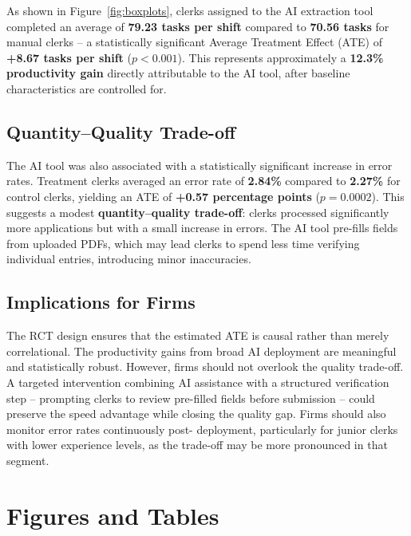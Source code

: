 \documentclass[12pt]{article}
\begin{document}
As shown in Figure~\ref{fig:boxplots}, clerks assigned to the AI
extraction tool completed an average of \textbf{79.23 tasks per
shift} compared to \textbf{70.56 tasks} for manual clerks -- a
statistically significant Average Treatment Effect (ATE) of
\textbf{+8.67 tasks per shift} ($p < 0.001$). This represents
approximately a \textbf{12.3\% productivity gain} directly
attributable to the AI tool, after baseline characteristics
are controlled for.

\subsection*{Quantity--Quality Trade-off}

The AI tool was also associated with a statistically significant
increase in error rates. Treatment clerks averaged an error rate
of \textbf{2.84\%} compared to \textbf{2.27\%} for control clerks,
yielding an ATE of \textbf{+0.57 percentage points} ($p = 0.0002$).
This suggests a modest \textbf{quantity--quality trade-off}: clerks
processed significantly more applications but with a small increase
in errors. The AI tool pre-fills fields from uploaded PDFs, which
may lead clerks to spend less time verifying individual entries,
introducing minor inaccuracies.

\subsection*{Implications for Firms}

The RCT design ensures that the estimated ATE is causal rather
than merely correlational. The productivity gains from broad AI
deployment are meaningful and statistically robust. However, firms
should not overlook the quality trade-off. A targeted intervention
combining AI assistance with a structured verification step --
prompting clerks to review pre-filled fields before submission
-- could preserve the speed advantage while closing the quality
gap. Firms should also monitor error rates continuously post-
deployment, particularly for junior clerks with lower experience
levels, as the trade-off may be more pronounced in that segment.

\section*{Figures and Tables}
\end{document}
